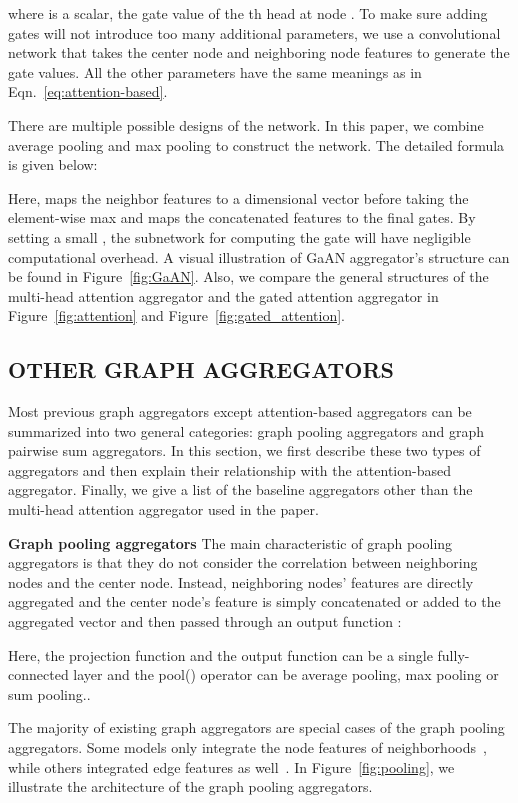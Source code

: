 \documentclass{article}
\begin{document}
	where  is a scalar, the gate value of the th head at node . To make sure adding gates will not introduce too many additional parameters, we use a convolutional network  that takes the center node and neighboring node features to generate the gate values. All the other parameters have the same meanings as in Eqn.~\eqref{eq:attention-based}.
	
	There are multiple possible designs of the  network. In this paper, we combine average pooling and max pooling to construct the network. The detailed formula is given below:
	\vskip -0.1in
	
	\vskip -0.1in
	Here,  maps the neighbor features to a  dimensional vector before taking the element-wise max and  maps the concatenated features to the final  gates. By setting a small , the subnetwork for computing the gate will have negligible computational overhead. A visual illustration of GaAN aggregator's structure can be found in Figure~\ref{fig:GaAN}. Also, we compare the general structures of the multi-head attention aggregator and the gated attention aggregator in Figure~\ref{fig:attention} and Figure~\ref{fig:gated_attention}.
	

	\subsection{OTHER GRAPH AGGREGATORS}
	\label{sec:existing_aggregator}
	
	Most previous graph aggregators except attention-based aggregators can be summarized into two general categories: graph pooling aggregators and graph pairwise sum aggregators. In this section, we first describe these two types of aggregators and then explain their relationship with the attention-based aggregator. Finally, we give a list of the baseline aggregators other than the multi-head attention aggregator used in the paper.

\textbf{Graph pooling aggregators}\quad
	The main characteristic of graph pooling aggregators is that they do not consider the correlation between neighboring nodes and the center node. Instead, neighboring nodes' features are directly aggregated and the center node's feature is simply concatenated or added to the aggregated vector and then passed through an output function :
	
	Here, the projection function  and the output function  can be a single fully-connected layer and the pool() operator can be average pooling, max pooling or sum pooling..
	
	The majority of existing graph aggregators are special cases of the graph pooling aggregators. Some models only integrate the node features of neighborhoods~\citep{duvenaud2015convolutional,kipf2017semi,hamilton2017inductive}, while others integrated edge features as well~\citep{atwood2016diffusion,fout2017protein,schutt2017quantum}. In Figure~\ref{fig:pooling}, we illustrate the architecture of the graph pooling aggregators.
\end{document}
